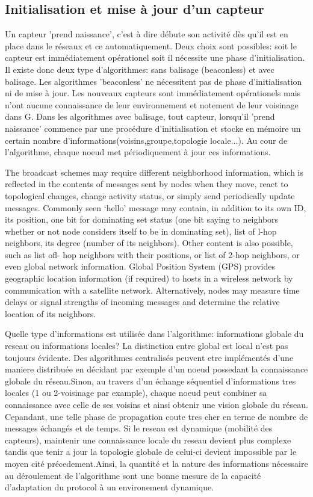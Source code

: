 \subsection{Initialisation et mise à jour d'un capteur}
Un capteur 'prend naissance', c'est à dire débute son activité dès qu'il est en place dans le réseaux et ce automatiquement. Deux choix sont possibles: soit le capteur est immédiatement opérationel soit il nécessite une phase 
d'initialisation. Il existe donc deux type d'algorithmes: sans balisage (beaconless) et avec balisage. Les algorithmes 'beaconless' ne nécessitent pas de phase d'initialisation ni de mise à jour. Les nouveaux capteurs sont immédiatement 
opérationels mais n'ont aucune connaissance de leur environnement et notement de leur voisinage dans G. Dans les algorithmes avec balisage, tout capteur, lorsqu'il 'prend naissance' commence par une procédure d'initialisation et stocke en 
mémoire un certain nombre d'informations(voisins,groupe,topologie locale...). Au cour de l'algorithme, chaque noeud met périodiquement à jour ces informations.

The broadcast schemes may require different neighborhood information, which is reflected in the contents of messages sent by nodes
 when they move, 
react to topological changes, change activity 
status, or simply send periodically update messages. Commonly seen `hello' message may contain, in addition to its own ID, its position, one bit for dominating set status (one bit saying to neighbors whether or not node 
considers itself to be in dominating set), list of l-hop neighbors, its degree (number of its neighbors). Other content is also possible, such as list ofl- hop neighbors with their positions, or list of 2-hop neighbors,
 or even global network information. Global Position System (GPS) provides geographic location information (if required) to hosts in a wireless network by communication with a satellite network. Alternatively, nodes may 
measure time delays or signal strengths of incoming messages and determine the relative location of its neighbors.

Quelle type d'informations est utilisée dans l'algorithme: informations globale du reseau ou informations locales? La distinction entre global est local n'est pas toujours évidente. Des algorithmes centralisés peuvent etre implémentés
 d'une maniere distribuée en décidant par exemple d'un noeud possedant la connaissance globale du réseau.Sinon, au travers d'un échange séquentiel d'informations tres locales (1 ou 2-voisinage par example), chaque noeud peut combiner sa 
connaissance avec celle de ses voisins et ainsi obtenir une vision globale du réseau. Cepandant, une telle phase de propagation coute tres cher en terme de nombre de messages échangés et de temps.
Si le reseau est dynamique (mobilité des capteurs), maintenir une connaissance locale du reseau devient plus complexe tandis que tenir a jour la topologie globale de celui-ci devient impossible par le moyen cité précedement.Ainsi, 
la quantité et la nature des informations nécessaire au déroulement de l'algorithme sont une bonne mesure de la capacité d'adaptation du protocol à un environement dynamique.   

